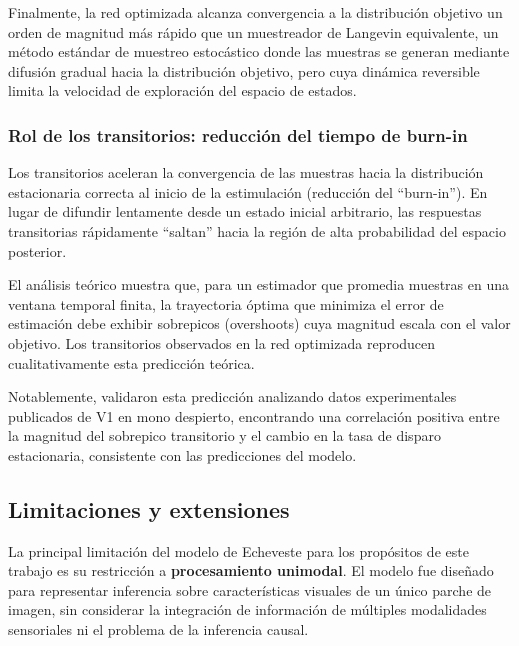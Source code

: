 Finalmente, la red optimizada alcanza convergencia a la distribución objetivo un orden de magnitud más rápido que un muestreador de Langevin equivalente, un método estándar de muestreo estocástico donde las muestras se generan mediante difusión gradual hacia la distribución objetivo, pero cuya dinámica reversible limita la velocidad de exploración del espacio de estados.

\subsubsection{Rol de los transitorios: reducción del tiempo de burn-in}

Los transitorios aceleran la convergencia de las muestras hacia la distribución estacionaria correcta al inicio de la estimulación (reducción del ``burn-in''). En lugar de difundir lentamente desde un estado inicial arbitrario, las respuestas transitorias rápidamente ``saltan'' hacia la región de alta probabilidad del espacio posterior.

El análisis teórico muestra que, para un estimador que promedia muestras en una ventana temporal finita, la trayectoria óptima que minimiza el error de estimación debe exhibir sobrepicos (overshoots) cuya magnitud escala con el valor objetivo. Los transitorios observados en la red optimizada reproducen cualitativamente esta predicción teórica.

Notablemente, \citeauthor{echeveste2020cortical} validaron esta predicción analizando datos experimentales publicados de V1 en mono despierto, encontrando una correlación positiva entre la magnitud del sobrepico transitorio y el cambio en la tasa de disparo estacionaria, consistente con las predicciones del modelo.

\subsection{Limitaciones y extensiones}
\label{subsec:echeveste_limitaciones}

La principal limitación del modelo de Echeveste para los propósitos de este trabajo es su restricción a \textbf{procesamiento unimodal}. El modelo fue diseñado para representar inferencia sobre características visuales de un único parche de imagen, sin considerar la integración de información de múltiples modalidades sensoriales ni el problema de la inferencia causal.

